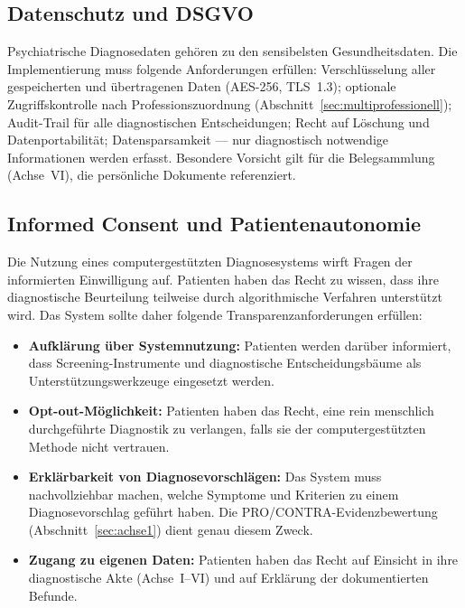 \documentclass[11pt,a4paper]{article}
\begin{document}
\subsection{Datenschutz und DSGVO}

Psychiatrische Diagnosedaten geh\"oren zu den sensibelsten Gesundheitsdaten. Die Implementierung muss folgende Anforderungen erf\"ullen: Verschl\"usselung aller gespeicherten und \"ubertragenen Daten (AES-256, TLS~1.3); optionale Zugriffskontrolle nach Professionszuordnung (Abschnitt~\ref{sec:multiprofessionell}); Audit-Trail f\"ur alle diagnostischen Entscheidungen; Recht auf L\"oschung und Datenportabilit\"at; Datensparsamkeit --- nur diagnostisch notwendige Informationen werden erfasst. Besondere Vorsicht gilt f\"ur die Belegsammlung (Achse~VI), die pers\"onliche Dokumente referenziert.

\subsection{Informed Consent und Patientenautonomie}

Die Nutzung eines computergest\"utzten Diagnosesystems wirft Fragen der informierten Einwilligung auf. Patienten haben das Recht zu wissen, dass ihre diagnostische Beurteilung teilweise durch algorithmische Verfahren unterst\"utzt wird. Das System sollte daher folgende Transparenzanforderungen erf\"ullen:

\begin{itemize}[noitemsep]
\item \textbf{Aufkl\"arung \"uber Systemnutzung:} Patienten werden dar\"uber informiert, dass Screening-Instrumente und diagnostische Entscheidungsb\"aume als Unterst\"utzungswerkzeuge eingesetzt werden.
\item \textbf{Opt-out-M\"oglichkeit:} Patienten haben das Recht, eine rein menschlich durchgef\"uhrte Diagnostik zu verlangen, falls sie der computergest\"utzten Methode nicht vertrauen.
\item \textbf{Erkl\"arbarkeit von Diagnosevorschl\"agen:} Das System muss nachvollziehbar machen, welche Symptome und Kriterien zu einem Diagnosevorschlag gef\"uhrt haben. Die PRO/CONTRA-Evidenzbewertung (Abschnitt~\ref{sec:achse1}) dient genau diesem Zweck.
\item \textbf{Zugang zu eigenen Daten:} Patienten haben das Recht auf Einsicht in ihre diagnostische Akte (Achse~I--VI) und auf Erkl\"arung der dokumentierten Befunde.
\end{itemize}
\end{document}
